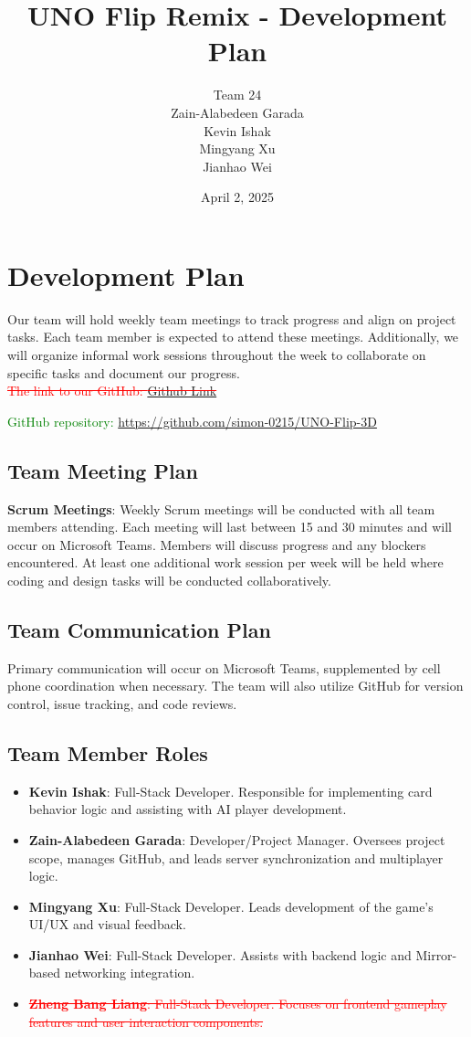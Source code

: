 \documentclass[12pt]{article}
\title{UNO Flip Remix - Development Plan}
\author{Team 24 \\ Zain-Alabedeen Garada \\ Kevin Ishak \\ Mingyang Xu \\ Jianhao Wei \\ \removed{Zheng Bang Liang}}
\date{April 2, 2025}
\newcommand{\removed}[1]{\textcolor{red}{\sout{#1}}}
\newcommand{\added}[1]{\textcolor{green}{#1}}
\begin{document}
\maketitle

\section*{Development Plan}

Our team will hold weekly team meetings to track progress and align on project tasks. Each team member is expected to attend these meetings. Additionally, we will organize informal work sessions throughout the week to collaborate on specific tasks and document our progress.\\
\removed{The link to our GitHub: \href{https://github.com/zgarada/team24_capstone}{Github Link}}\\
\item \added{GitHub repository: \href{https://github.com/simon-0215/UNO-Flip-3D}{https://github.com/simon-0215/UNO-Flip-3D}}

\subsection*{Team Meeting Plan}
\textbf{Scrum Meetings}: Weekly Scrum meetings will be conducted with all team members attending. Each meeting will last between 15 and 30 minutes and will occur on Microsoft Teams. Members will discuss progress and any blockers encountered. At least one additional work session per week will be held where coding and design tasks will be conducted collaboratively.

\subsection*{Team Communication Plan}
Primary communication will occur on Microsoft Teams, supplemented by cell phone coordination when necessary. The team will also utilize GitHub for version control, issue tracking, and code reviews.

\subsection*{Team Member Roles}
\begin{itemize}
    \item \textbf{Kevin Ishak}: Full-Stack Developer. Responsible for implementing card behavior logic and assisting with AI player development.
    \item \textbf{Zain-Alabedeen Garada}: Developer/Project Manager. Oversees project scope, manages GitHub, and leads server synchronization and multiplayer logic.
    \item \textbf{Mingyang Xu}: Full-Stack Developer. Leads development of the game’s UI/UX and visual feedback.
    \item \textbf{Jianhao Wei}: Full-Stack Developer. Assists with backend logic and Mirror-based networking integration.
    \item \removed{ \textbf{Zheng Bang Liang}: Full-Stack Developer. Focuses on frontend gameplay features and user interaction components.}
\end{itemize}
\end{document}
